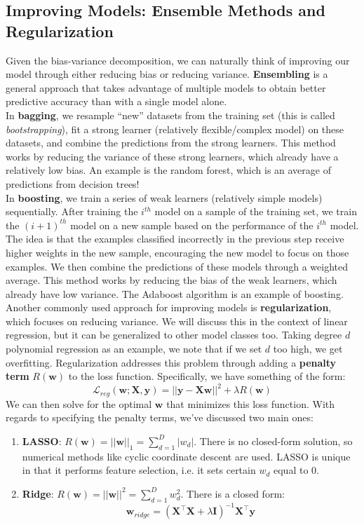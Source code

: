 \documentclass[11pt, letterpaper]{article}
\theoremstyle{definition}
\theoremstyle{plain}
\begin{document}
\subsection{Improving Models: Ensemble Methods and Regularization}
Given the bias-variance decomposition, we can naturally think of improving our model through either reducing bias or reducing variance. \textbf{Ensembling} is a general approach that takes advantage of multiple models to obtain better predictive accuracy than with a single model alone. \\

In \textbf{bagging}, we resample ``new'' datasets from the training set (this is called \textit{bootstrapping}), fit a strong learner (relatively flexible/complex model) on these datasets, and combine the predictions from the strong learners. This method works by reducing the variance of these strong learners, which already have a relatively low bias. An example is the random forest, which is an average of predictions from decision trees! \\

In \textbf{boosting}, we train a series of weak learners (relatively simple models) sequentially. After training the $i^{th}$ model on a sample of the training set, we train the $(i+1)^{th}$ model on a new sample based on the performance of the $i^{th}$ model. The idea is that the examples classified incorrectly in the previous step receive higher weights in the new sample, encouraging the new model to focus on those examples. We then combine the predictions of these models through a weighted average. This method works by reducing the bias of the weak learners, which already have low variance. The Adaboost algorithm is an example of boosting. \\

Another commonly used approach for improving models is \textbf{regularization}, which focuses on reducing variance. We will discuss this in the context of linear regression, but it can be generalized to other model classes too. Taking degree $d$ polynomial regression as an example, we note that if we set $d$ too high, we get overfitting. Regularization addresses this problem through adding a \textbf{penalty term} $R(\bm w)$ to the loss function. Specifically, we have something of the form:
\[\mathcal{L}_{reg}(\bm w; \bm X, \bm y) = ||\bm y - \bm X \bm w||^2 + \lambda R(\bm w)\]
We can then solve for the optimal $\bm w$ that minimizes this loss function. With regards to specifying the penalty terms, we've discussed two main ones:
\begin{enumerate}
    \item \textbf{LASSO}: $R(\bm w) = ||\bm w||_1 = \sum_{d=1}^{D}|w_d|$. There is no closed-form solution, so numerical methods like cyclic coordinate descent are used. LASSO is unique in that it performs feature selection, i.e. it sets certain $w_d$ equal to 0.
    \item \textbf{Ridge}: $R(\bm w) = ||\bm w||^2 = \sum_{d=1}^{D}w_d^2$. There is a closed form:
    \[\bm w_{ridge} = (\bm{X}^\top\bm{X} + \lambda \bm I)^{-1}\bm{X}^\top\bm{y}\]
\end{enumerate}
\end{document}
